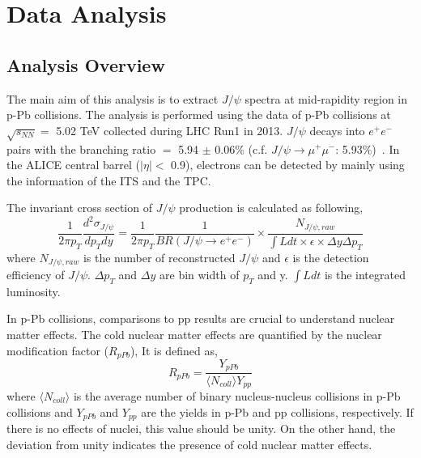 \chapter{Data Analysis}
\label{chap_ana}
\section{Analysis Overview}
\label{sec_4_overview}

The main aim of this analysis is to extract $J/\psi$ spectra at mid-rapidity region in p-Pb collisions.  
The analysis is performed using the data of p-Pb collisions at $\sqrt{s_{NN}} =$ 5.02 TeV collected during LHC Run1 in 2013.
$J/\psi$ decays into $e^{+}e^{-}$ pairs with the branching ratio $=$ 5.94 $\pm$ 0.06\% (c.f. $J/\psi\rightarrow\mu^{+}\mu^{-}$: 5.93\%)~\cite{bib_pdg}.
In the ALICE central barrel ($|\eta| <$ 0.9), electrons can be detected by mainly using the information of the ITS and the TPC. 

The invariant cross section of $J/\psi$ production is calculated as following,  
\begin{equation}
  \frac{1}{2\pi p_{T}}\frac{d^{2}\sigma_{J/\psi}}{dp_{T}dy} =  \frac{1}{2\pi p_{T}}\frac{1}{BR(J/\psi\rightarrow e^{+}e^{-})} \times \frac{N_{J/\psi ,raw}}{\int{L}dt \times \epsilon \times \Delta y \Delta p_{T}}
\end{equation}
where $N_{J/\psi ,raw}$ is the number of reconstructed $J/\psi$ and $\epsilon$ is the detection efficiency of $J/\psi$. 
$\Delta p_{T}$ and $\Delta y$ are bin width of $p_{T}$ and y. 
$\int{L}dt$ is the integrated luminosity.

In p-Pb collisions, comparisons to pp results are crucial to understand nuclear matter effects. 
The cold nuclear matter effects are quantified by the nuclear modification factor ($R_{pPb}$),  
It is defined as, 
\begin{equation}
  R_{pPb} = \frac{Y_{pPb}}{\langle N_{coll}\rangle Y_{pp}}
\end{equation}
where $\langle N_{coll}\rangle$ is the average number of binary nucleus-nucleus collisions in p-Pb collisions and $Y_{pPb}$ and $Y_{pp}$ are the yields in p-Pb and pp collisions, respectively.
If there is no effects of nuclei, this value should be unity. 
On the other hand, the deviation from unity indicates the presence of cold nuclear matter effects.

